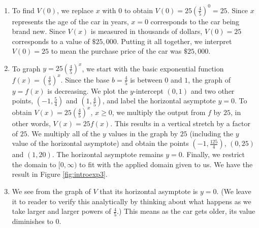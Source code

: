 {
\begin{enumerate}

\item  To find $V(0)$, we replace $x$ with $0$ to obtain $V(0) = 25\left(\frac{4}{5}\right)^{0} = 25$.  Since $x$ represents the age of the car in years, $x=0$ corresponds to the car being brand new.  Since $V(x)$ is measured in thousands of dollars, $V(0)=25$ corresponds to a value of $\$ 25,\!000$.  Putting it all together, we interpret $V(0)=25$ to mean the purchase price of the car was $\$25,\!000$.

\item  To graph $y=25\left(\frac{4}{5}\right)^{x}$,  we start with the basic exponential function $f(x)=\left(\frac{4}{5}\right)^{x}$.  Since the base $b = \frac{4}{5}$ is between $0$ and $1$, the graph of $y=f(x)$ is decreasing.  We plot the $y$-intercept $(0,1)$ and two other points, $\left(-1, \frac{5}{4}\right)$ and $\left(1, \frac{4}{5}\right)$, and label the horizontal asymptote $y=0$.  To obtain $V(x) = 25\left(\frac{4}{5}\right)^{x}$, $x \geq 0$, we multiply the output from $f$ by $25$, in other words, $V(x) = 25 f(x)$. This results in a vertical stretch by a factor of $25$.  We multiply all of the $y$ values in the graph by $25$ (including the $y$ value of the horizontal asymptote) and obtain the points $\left(-1,\frac{125}{4}\right)$, $(0,25)$ and $(1,20)$. The horizontal asymptote remains $y=0$. Finally, we restrict the domain to $[0,\infty)$ to fit with the applied domain given to us.  We have the result in Figure \ref{fig:introexp3}.


\item  We see from the graph of $V$ that its horizontal asymptote is $y=0$.  (We leave it to reader to verify this analytically by thinking about what happens as we take larger and larger powers of $\frac{4}{5}$.)  This means as the car gets older, its value diminishes to $0$. 
 
\end{enumerate}
}

